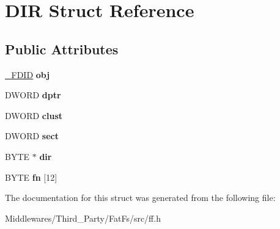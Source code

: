 \hypertarget{struct_d_i_r}{}\section{D\+IR Struct Reference}
\label{struct_d_i_r}
\subsection*{Public Attributes}
\begin{DoxyCompactItemize}
\item 
\mbox{\label{struct_d_i_r_a5a4848c51616bf4ad90518c211ca3bb3}} 
\mbox{\hyperlink{struct___f_d_i_d}{\+\_\+\+F\+D\+ID}} {\bfseries obj}
\item 
\mbox{\label{struct_d_i_r_a0330e9554e1f38795debe4495156873e}} 
D\+W\+O\+RD {\bfseries dptr}
\item 
\mbox{\label{struct_d_i_r_acfbb8ba2d6e73b6f999ceffd1857c190}} 
D\+W\+O\+RD {\bfseries clust}
\item 
\mbox{\label{struct_d_i_r_ad01fcc812ed0dad11a593574336adc9e}} 
D\+W\+O\+RD {\bfseries sect}
\item 
\mbox{\label{struct_d_i_r_a6c2a8c0cf2d55ae99775e93a16593449}} 
B\+Y\+TE $\ast$ {\bfseries dir}
\item 
\mbox{\label{struct_d_i_r_ad90d974c0e7640307598c586bf141b32}} 
B\+Y\+TE {\bfseries fn} \mbox{[}12\mbox{]}
\end{DoxyCompactItemize}


The documentation for this struct was generated from the following file\+:\begin{DoxyCompactItemize}
\item 
Middlewares/\+Third\+\_\+\+Party/\+Fat\+Fs/src/ff.\+h\end{DoxyCompactItemize}

